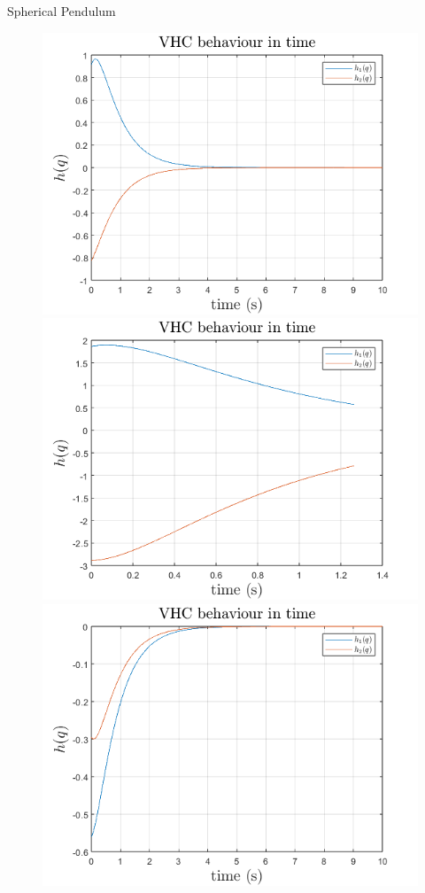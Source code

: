 \documentclass[xcolor=dvipsnames]{beamer}
\begin{document}
\begin{frame}{Spherical Pendulum}
    \begin{figure}[h]
    \centering
    \includegraphics[width=0.48\textheight]{assets/sp1.png}
    \includegraphics[width=0.48\textheight]{assets/sp2.png}
    \includegraphics[width=0.48\textheight]{assets/sp3.png}

\end{figure}
\end{frame}
\end{document}

